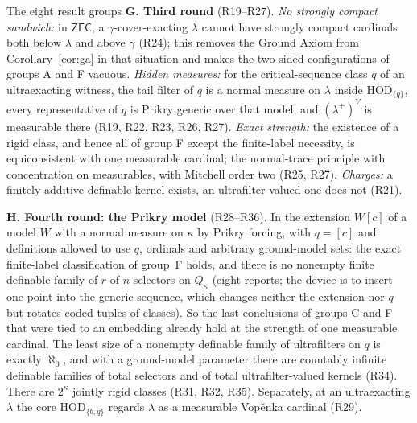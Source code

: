 \documentclass[11pt,letterpaper]{article}
\theoremstyle{definition}
\numberwithin{equation}{section}
\newcommand{\ZFC}{\mathsf{ZFC}}
\newcommand{\HOD}{\mathrm{HOD}}
\newcommand{\R}[1]{\textsf{R#1}}
\begin{document}
\begin{assessment}{The eight result groups}
\textbf{G. Third round} (\R{19}--\R{27}). \emph{No strongly compact sandwich:} in $\ZFC$, a $\gamma$-cover-exacting $\lambda$ cannot have strongly compact cardinals both below $\lambda$ and above $\gamma$ (\R{24}); this removes the Ground Axiom from Corollary~\ref{cor:ga} in that situation and makes the two-sided configurations of groups A and F vacuous. \emph{Hidden measures:} for the critical-sequence class $q$ of an ultraexacting witness, the tail filter of $q$ is a normal measure on $\lambda$ inside $\HOD_{\{q\}}$, every representative of $q$ is Prikry generic over that model, and $(\lambda^+)^V$ is measurable there (\R{19}, \R{22}, \R{23}, \R{26}, \R{27}). \emph{Exact strength:} the existence of a rigid class, and hence all of group F except the finite-label necessity, is equiconsistent with one measurable cardinal; the normal-trace principle with concentration on measurables, with Mitchell order two (\R{25}, \R{27}). \emph{Charges:} a finitely additive definable kernel exists, an ultrafilter-valued one does not (\R{21}).

\textbf{H. Fourth round: the Prikry model} (\R{28}--\R{36}). In the extension $W[c]$ of a model $W$ with a normal measure on $\kappa$ by Prikry forcing, with $q=[c]$ and definitions allowed to use $q$, ordinals and arbitrary ground-model sets: the exact finite-label classification of group~F holds, and there is no nonempty finite definable family of $r$-of-$n$ selectors on $Q_\kappa$ (eight reports; the device is to insert one point into the generic sequence, which changes neither the extension nor $q$ but rotates coded tuples of classes). So the last conclusions of groups C and F that were tied to an embedding already hold at the strength of one measurable cardinal. The least size of a nonempty definable family of ultrafilters on $q$ is exactly $\aleph_0$, and with a ground-model parameter there are countably infinite definable families of total selectors and of total ultrafilter-valued kernels (\R{34}). There are $2^\kappa$ jointly rigid classes (\R{31}, \R{32}, \R{35}). Separately, at an ultraexacting $\lambda$ the core $\HOD_{\{b,q\}}$ regards $\lambda$ as a measurable Vop\v enka cardinal (\R{29}).
\end{assessment}
\end{document}
